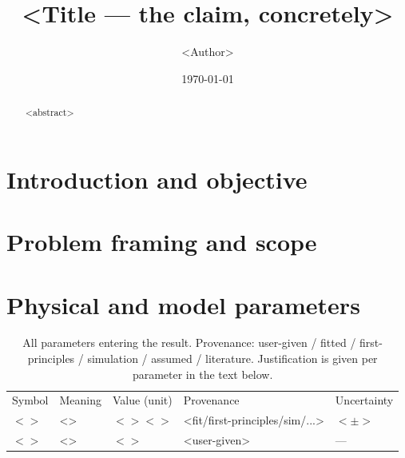 \documentclass[
  aps, prx,            %
  reprint,             %
  amsmath, amssymb,    %
  nofootinbib,
  superscriptaddress,
]{revtex4-2}
\begin{document}
\title{\textsf{<Title — the claim, concretely>}}
\author{<Author>}
\date{\today}

\begin{abstract}
<abstract>
\end{abstract}

\maketitle

\section{Introduction and objective}\label{sec:intro}

\section{Problem framing and scope}\label{sec:scope}

\section{Physical and model parameters}\label{sec:params}
\begin{table}[t]
  \caption{\label{tab:params}%
    All parameters entering the result. Provenance: user-given / fitted / first-principles /
    simulation / assumed / literature. Justification is given per parameter in the text below.}
  \begin{ruledtabular}
  \begin{tabular}{l l l l l}
    Symbol & Meaning & Value (unit) & Provenance & Uncertainty \\
    \colrule
    $<>$ & <> & $<>\unit{<>}$ & <fit/first-principles/sim/...> & $<\pm>$ \\
    $<>$ & <> & $<>$          & <user-given>                   & --- \\
  \end{tabular}
  \end{ruledtabular}
\end{table}
\end{document}
